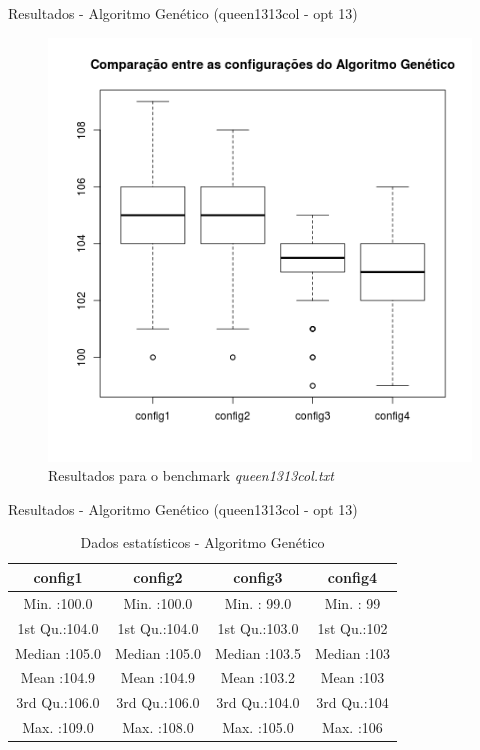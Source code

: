 \documentclass[compress, hide notes]{beamer}
\begin{document}
        \begin{frame}{Resultados - Algoritmo Genético (queen1313col - opt 13)}
        
        	\begin{figure}[H]
			\centering
            \label{fig:sol-ga-queen1313col}
            \includegraphics[width=0.5\linewidth]{img/ga-sol-queen1313col.png}
            \caption[Resultados para o benchmark queen1313col.txt]{Resultados para o benchmark \textit{queen1313col.txt}}
			\end{figure}

		\end{frame}
        
        \begin{frame}{Resultados - Algoritmo Genético (queen1313col - opt 13)}
        
        	\begin{table}[H]
            \centering
              \begin{tabular}{c|c|c|c}
               \textbf{config1}       &  \textbf{config2}              & \textbf{config3}                 & \textbf{config4}                          \\ \hline \hline
               Min.   :100.0 &         Min.   :100.0 &           Min.   : 99.0 &           Min.   : 99            \\ \hline
               1st Qu.:104.0 &         1st Qu.:104.0 &          1st Qu.:103.0  &          1st Qu.:102             \\ \hline
               Median :105.0 &         Median :105.0 &          Median :103.5  &          Median :103             \\ \hline
               Mean   :104.9 &         Mean   :104.9 &          Mean   :103.2  &           Mean   :103            \\ \hline
               3rd Qu.:106.0 &         3rd Qu.:106.0 &          3rd Qu.:104.0  &          3rd Qu.:104             \\ \hline
               Max.   :109.0 &         Max.   :108.0 &          Max.   :105.0  &          Max.   :106             \\ 
              \end{tabular}
              \caption {Dados estatísticos - Algoritmo Genético}
        	\end{table}

		\end{frame}
        
\end{document}
